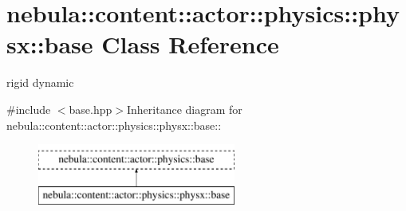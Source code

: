 \hypertarget{classnebula_1_1content_1_1actor_1_1physics_1_1physx_1_1base}{
\section{nebula::content::actor::physics::physx::base Class Reference}
\label{classnebula_1_1content_1_1actor_1_1physics_1_1physx_1_1base}
}


rigid dynamic  


{\ttfamily \#include $<$base.hpp$>$}Inheritance diagram for nebula::content::actor::physics::physx::base::\begin{figure}[H]
\begin{center}
\leavevmode
\includegraphics[height=2cm]{classnebula_1_1content_1_1actor_1_1physics_1_1physx_1_1base}
\end{center}
\end{figure}
